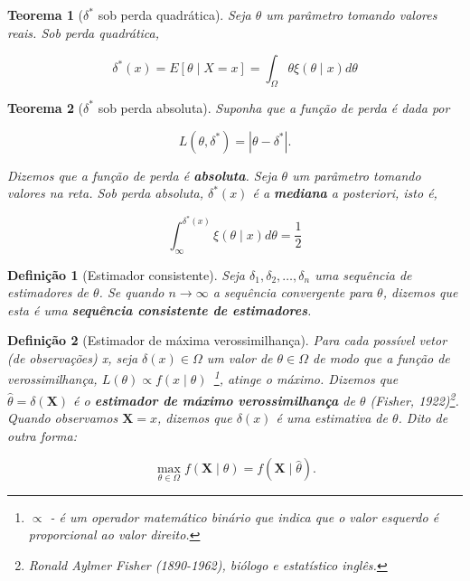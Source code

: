 \documentclass{article}
\newtheorem{theorem}{Teorema}
\newtheorem{definition}{Definição}
\begin{document}
\begin{theorem}[$\delta^*$ sob perda quadrática]
Seja $\theta$ um parâmetro tomando valores reais. Sob perda quadrática,

\begin{equation}
\delta^*(x) = E[\theta \mid X = x] = \int_\Omega \theta \xi(\theta \mid x) d \theta
\end{equation}
\end{theorem}

\begin{theorem}[$\delta^*$ sob perda absoluta]
Suponha que a função de perda é dada por

\begin{equation}
    L(\theta, \delta^*) = | \theta - \delta^*|.
\end{equation}

Dizemos que a função de perda é \textbf{absoluta}.
Seja $\theta$ um parâmetro tomando valores na reta. Sob perda absoluta, $\delta^*(x)$ é a \textbf{mediana} a posteriori, isto é,

\begin{equation}
    \int_{\infty}^{\delta^*(x)} \xi(\theta \mid x) d \theta = \frac{1}{2}
\end{equation}
\end{theorem}

\begin{definition}[Estimador consistente]
Seja $\delta_1, \delta_2, \ldots, \delta_n$ uma sequência de estimadores de $\theta$. Se quando $n \rightarrow \infty$ a sequência convergente para $\theta$, dizemos que esta é uma \textbf{sequência consistente de estimadores}.
\end{definition}

\begin{definition}[Estimador de máxima verossimilhança]
Para cada possível vetor (de observações) x, seja $\delta(x) \in \Omega$ um valor de $\theta \in \Omega$ de modo que a função de verossimilhança, $L(\theta) \propto f(x \mid \theta)$~\footnote{$\propto$ - é um operador matemático binário que indica que o valor esquerdo é proporcional ao valor direito.}, atinge o máximo.
Dizemos que $\hat\theta = \delta(\textbf{X})$ é o \textbf{estimador de máximo verossimilhança} de $\theta$ (Fisher, 1922)\footnote{Ronald Aylmer Fisher (1890-1962), biólogo e estatístico inglês.}. Quando observamos $\textbf{X} = x$, dizemos que $\delta(x)$ é uma estimativa de $\theta$. Dito de outra forma:

\begin{equation}
    \max_{\theta \in \Omega} f(\textbf{X} \mid \theta) = f(\textbf{X} \mid \hat\theta).
\end{equation}
\end{definition}
\end{document}
